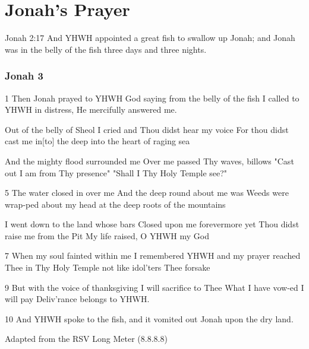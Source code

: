 \documentclass{article}
\begin{document}
\section*{Jonah's Prayer}

Jonah 2:17 And YHWH appointed a great fish to swallow up Jonah; and Jonah was in the belly of the fish three days and three nights.

\subsubsection*{Jonah 3}

1 Then Jonah prayed to YHWH God\newline
saying from the belly of the fish I called to YHWH in distress,\newline
He mercifully answered me.\newline

Out of the belly of Sheol\newline
I cried and Thou didst hear my voice For thou didst cast me in[to] the deep\newline
into the heart of raging sea\newline

And the mighty flood surrounded me\newline
Over me passed Thy waves, billows  "Cast out I am from Thy presence"\newline
"Shall I Thy Holy Temple see?"\newline

5 The water closed in over me\newline
And the deep round about me was\newline
Weeds were wrap-ped about my head at the deep roots of the mountains\newline

I went down to the land whose bars\newline
Closed upon me forevermore\newline
yet Thou didst raise me from the Pit\newline
My life raised, O YHWH my God\newline

7 When my soul fainted within me\newline
I remembered YHWH and my prayer\newline
reached Thee in Thy Holy Temple not like idol'ters Thee forsake\newline

9 But with the voice of thanksgiving\newline
I will sacrifice to Thee\newline
What I have vow-ed I will pay\newline
Deliv'rance belongs to YHWH.\newline

10 And YHWH spoke to the fish, and it vomited out Jonah upon the dry land.


Adapted from the RSV 
Long Meter (8.8.8.8)
\end{document}
